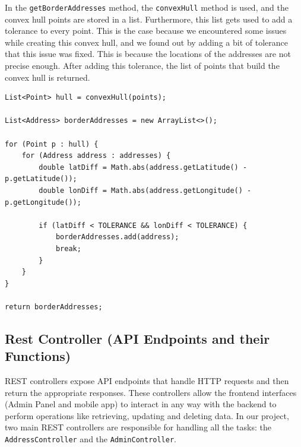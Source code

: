     In the \texttt{getBorderAddresses} method, the \texttt{convexHull} method is used, and the convex hull points are stored in a list. Furthermore, this list gets used to add a tolerance to every point. This is the case because we encountered some issues while creating this convex hull, and we found out by adding a bit of tolerance that this issue was fixed. This is because the locations of the addresses are not precise enough. After adding this tolerance, the list of points that build the convex hull is returned.
    \begin{verbatim}
List<Point> hull = convexHull(points);

List<Address> borderAddresses = new ArrayList<>();
        
for (Point p : hull) {
    for (Address address : addresses) {
        double latDiff = Math.abs(address.getLatitude() - p.getLatitude());
        double lonDiff = Math.abs(address.getLongitude() - p.getLongitude());
        
        if (latDiff < TOLERANCE && lonDiff < TOLERANCE) {
            borderAddresses.add(address);
            break;
        }
    }
}
        
return borderAddresses;
    \end{verbatim}

    \subsection{Rest Controller (API Endpoints and their Functions)}

    REST controllers expose API endpoints that handle HTTP requests and then return the appropriate responses. These controllers allow the frontend interfaces (Admin Panel and mobile app) to interact in any way with the backend to perform operations like retrieving, updating and deleting data. In our project, two main REST controllers are responsible for handling all the tasks: the \texttt{AddressController} and the \texttt{AdminController}.

    \pagebreak

